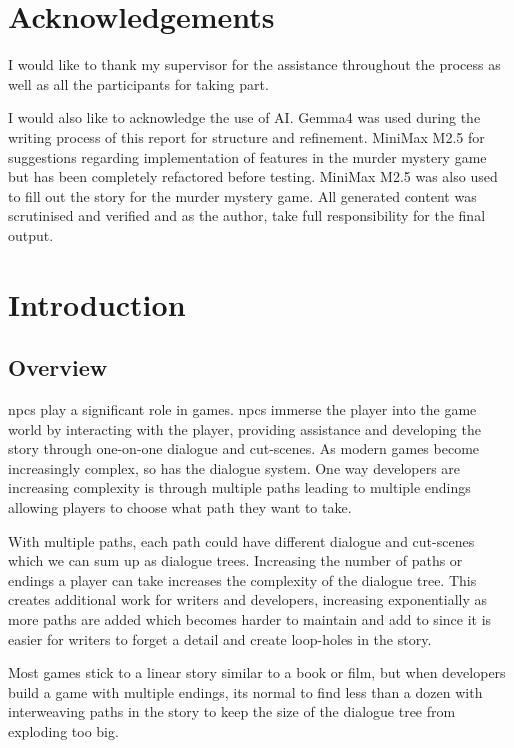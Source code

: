 \documentclass[12pt, a4paper]{report}
\begin{document}
	\chapter*{Acknowledgements}
	I would like to thank my supervisor for the assistance throughout the process as well as all the participants for taking part.
	
	I would also like to acknowledge the use of AI. Gemma4 was used during the writing process of this report for structure and refinement. MiniMax M2.5 for suggestions regarding implementation of features in the murder mystery game but has been completely refactored before testing. MiniMax M2.5 was also used to fill out the story for the murder mystery game. All generated content was scrutinised and verified and as the author, take full responsibility for the final output.
	
	\tableofcontents
	\listoffigures
	\listoftables
	\printglossary[type=\acronymtype, title=List of Abbreviations]
	
	\newpage
	
	\chapter{Introduction}
	\section{Overview}
	\gls{npc}s play a significant role in games. \gls{npc}s immerse the player into the game world by interacting with the player, providing assistance and developing the story through one-on-one dialogue and cut-scenes. As modern games become increasingly complex, so has the dialogue system. One way developers are increasing complexity is through multiple paths leading to multiple endings allowing players to choose what path they want to take.
	
	With multiple paths, each path could have different dialogue and cut-scenes which we can sum up as dialogue trees. Increasing the number of paths or endings a player can take increases the complexity of the dialogue tree. This creates additional work for writers and developers, increasing exponentially as more paths are added which becomes harder to maintain and add to since it is easier for writers to forget a detail and create loop-holes in the story.
	
	Most games stick to a linear story similar to a book or film, but when developers build a game with multiple endings, its normal to find less than a dozen with interweaving paths in the story to keep the size of the dialogue tree from exploding too big.
	
\end{document}
